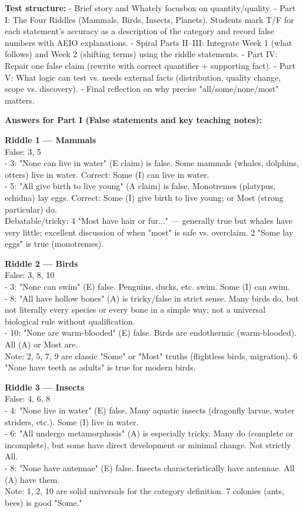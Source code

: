 \documentclass[12pt]{article}
\begin{document}
\textbf{Test structure:}
- Brief story and Whately focusbox on quantity/quality.
- Part I: The Four Riddles (Mammals, Birds, Insects, Planets). Students mark T/F for each statement's accuracy as a description of the category and record false numbers with AEIO explanations.
- Spiral Parts II–III: Integrate Week 1 (what follows) and Week 2 (shifting terms) using the riddle statements.
- Part IV: Repair one false claim (rewrite with correct quantifier + supporting fact).
- Part V: What logic can test vs. needs external facts (distribution, quality change, scope vs. discovery).
- Final reflection on why precise "all/some/none/most" matters.

\textbf{Answers for Part I (False statements and key teaching notes):}

\textbf{Riddle 1 — Mammals}\\
False: 3, 5\\
- 3: "None can live in water" (E claim) is false. Some mammals (whales, dolphins, otters) live in water. Correct: Some (I) can live in water.\\
- 5: "All give birth to live young" (A claim) is false. Monotremes (platypus, echidna) lay eggs. Correct: Some (I) give birth to live young; or Most (strong particular) do.\\
Debatable/tricky: 4 "Most have hair or fur..." — generally true but whales have very little; excellent discussion of when "most" is safe vs. overclaim. 2 "Some lay eggs" is true (monotremes).

\textbf{Riddle 2 — Birds}\\
False: 3, 8, 10\\
- 3: "None can swim" (E) false. Penguins, ducks, etc. swim. Some (I) can swim.\\
- 8: "All have hollow bones" (A) is tricky/false in strict sense. Many birds do, but not literally every species or every bone in a simple way; not a universal biological rule without qualification.\\
- 10: "None are warm-blooded" (E) false. Birds are endothermic (warm-blooded). All (A) or Most are.\\
Note: 2, 5, 7, 9 are classic "Some" or "Most" truths (flightless birds, migration). 6 "None have teeth as adults" is true for modern birds.

\textbf{Riddle 3 — Insects}\\
False: 4, 6, 8\\
- 4: "None live in water" (E) false. Many aquatic insects (dragonfly larvae, water striders, etc.). Some (I) live in water.\\
- 6: "All undergo metamorphosis" (A) is especially tricky. Many do (complete or incomplete), but some have direct development or minimal change. Not strictly All.\\
- 8: "None have antennae" (E) false. Insects characteristically have antennae. All (A) have them.\\
Note: 1, 2, 10 are solid universals for the category definition. 7 colonies (ants, bees) is good "Some."
\end{document}
